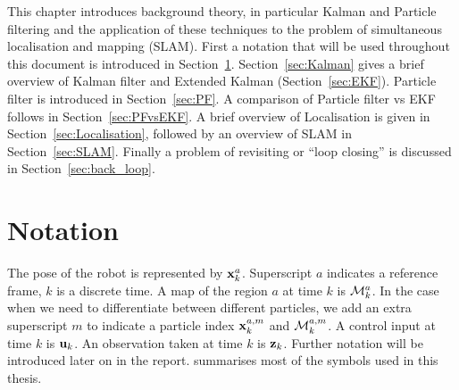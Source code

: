 This chapter introduces background theory, in particular Kalman and
Particle filtering and the application of these techniques to the
problem of simultaneous localisation and mapping (SLAM). First a
notation that will be used throughout this document is introduced in
Section~\ref{sec:Notation}. Section~\ref{sec:Kalman} gives a brief
overview of Kalman filter and Extended Kalman (Section~\ref{sec:EKF}).
Particle filter is introduced in Section~\ref{sec:PF}. A comparison of
Particle filter vs EKF follows in Section~\ref{sec:PFvsEKF}. A brief
overview of Localisation is given in Section~\ref{sec:Localisation},
followed by an overview of SLAM in Section~\ref{sec:SLAM}. Finally a
problem of revisiting or ``loop closing'' is discussed in
Section~\ref{sec:back_loop}.


\section {Notation}
\label{sec:Notation}

The pose of the robot is represented by $\x{k}{}{a}$. Superscript
$a$ indicates a reference frame, $k$ is a discrete time. A map of the
region $a$ at time $k$ is $\map{k}{}{a}$. In the case when we need to
differentiate between different particles, we add an extra superscript
$m$ to indicate a particle index $\x{k}{a}{m}$ and $\map{k}{a}{m}$. A
control input at time $k$ is ${\bf u}_{k}$. An observation taken at time $k$
is ${\bf z}_{k}$. Further notation will be introduced later on in the
report.  summarises most of the symbols used in
this thesis.




